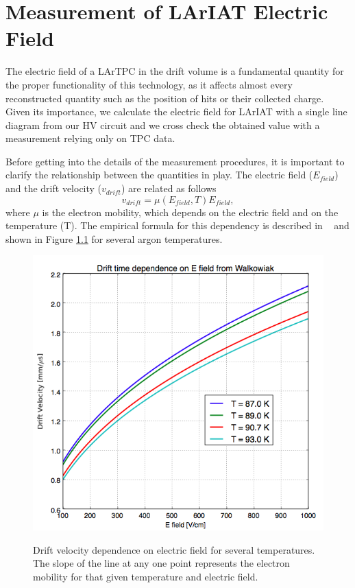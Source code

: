 \chapter{Measurement of LArIAT Electric Field}\label{ch:AppendixB}
The electric field of a LArTPC in the drift volume is a fundamental quantity for the proper functionality of this technology, as it affects almost every reconstructed quantity such as the position of hits or their collected charge. Given its importance, we calculate the electric field for LArIAT with a single line diagram from our HV circuit and we cross check the obtained value with a measurement relying only on TPC data. 

Before getting into the details of the measurement procedures, it is important to clarify the relationship between the  quantities in play. The electric field ($E_{field}$) and the drift velocity ($v_{drift}$) are related as follows 
\begin{equation} v_{drift} = \mu(E_{field},T) E_{field}, \label{eq:vd}
\end{equation}
where $\mu$ is the electron mobility, which depends on the electric field and on the temperature (T). The empirical formula for this dependency is described in ~\cite{WWW} and shown in Figure \ref{fig:EV} for several argon temperatures.

\begin{figure}[htb]
\centering
\includegraphics[scale=0.45]{./AppendixB-EField/Images/Walkowiak.png}\\
\caption{Drift velocity dependence on electric field for several temperatures. The slope of the line at any one point represents the electron mobility for that given temperature and electric field.}
\label{fig:EV}
\end{figure}



